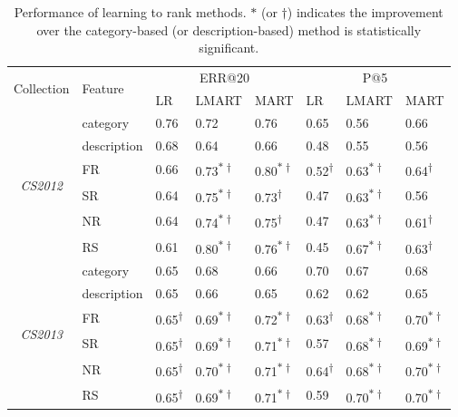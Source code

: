 \begin{table}[t]
\centering
\caption{
Performance of learning to rank methods.
$\ast$ (or $\dagger$) indicates the improvement over the category-based (or description-based)
method is statistically significant.
}

\label{table:learning_to_rank_results_1}
\renewcommand{\arraystretch}{1.2}

\begin{tabular}{ |c|l|lll|lll| }
\hline
\multirow{2}{*}{Collection} & \multirow{2}{*}{Feature} & \multicolumn{3}{c|}{ERR@20} & \multicolumn{3}{c|}{P@5} \\
 & & LR & LMART & MART & LR & LMART & MART \\ \hline \hline
\multirow{6}{*}{\em CS2012} & category & 0.76 & 0.72 & 0.76 & 0.65 & 0.56 & 0.66 \\
 & description & 0.68 & 0.64 & 0.66 & 0.48 & 0.55 & 0.56 \\ \cline{2-8}
 & FR & 0.66 & 0.73\textsuperscript{$\ast \dagger$} & 0.80\textsuperscript{$\ast \dagger$} & 0.52\textsuperscript{$\dagger$} & 0.63\textsuperscript{$\ast \dagger$} & 0.64\textsuperscript{$\dagger$} \\
 & SR & 0.64 & 0.75\textsuperscript{$\ast \dagger$} & 0.73\textsuperscript{$\dagger$} & 0.47 & 0.63\textsuperscript{$\ast \dagger$} & 0.56 \\
 & NR & 0.64 & 0.74\textsuperscript{$\ast \dagger$} & 0.75\textsuperscript{$\dagger$} & 0.47 & 0.63\textsuperscript{$\ast \dagger$} & 0.61\textsuperscript{$\dagger$} \\
 & RS & 0.61 & 0.80\textsuperscript{$\ast \dagger$} & 0.76\textsuperscript{$\ast \dagger$} & 0.45 & 0.67\textsuperscript{$\ast \dagger$} & 0.63\textsuperscript{$\dagger$} \\
\hline
\hline

\multirow{6}{*}{\em CS2013} & category & 0.65 & 0.68 & 0.66 & 0.70 & 0.67 & 0.68 \\
 & description & 0.65 & 0.66 & 0.65 & 0.62 & 0.62 & 0.65 \\  \cline{2-8}
 & FR & 0.65\textsuperscript{$\dagger$} & 0.69\textsuperscript{$\ast \dagger$} & 0.72\textsuperscript{$\ast \dagger$} & 0.63\textsuperscript{$\dagger$} & 0.68\textsuperscript{$\ast \dagger$} & 0.70\textsuperscript{$\ast \dagger$} \\
 & SR & 0.65\textsuperscript{$\dagger$} & 0.69\textsuperscript{$\ast \dagger$} & 0.71\textsuperscript{$\ast \dagger$} & 0.57 & 0.68\textsuperscript{$\ast \dagger$} & 0.69\textsuperscript{$\ast \dagger$} \\
 & NR & 0.65\textsuperscript{$\dagger$} & 0.70\textsuperscript{$\ast \dagger$} & 0.71\textsuperscript{$\ast \dagger$} & 0.64\textsuperscript{$\dagger$} & 0.68\textsuperscript{$\ast \dagger$} & 0.70\textsuperscript{$\ast \dagger$} \\
 & RS & 0.65\textsuperscript{$\dagger$} & 0.69\textsuperscript{$\ast \dagger$} & 0.71\textsuperscript{$\ast \dagger$} & 0.59 & 0.70\textsuperscript{$\ast \dagger$} & 0.70\textsuperscript{$\ast \dagger$} \\
\hline
 \hline


\end{tabular}
\end{table}

